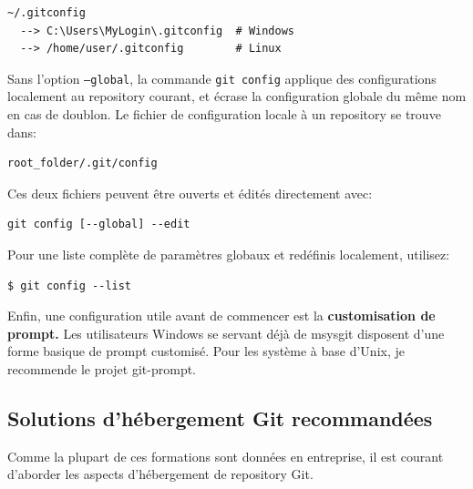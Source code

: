\documentclass{../../common/tufte-latex/tufte-handout}
\begin{document}
\begin{lstlisting}[style=BashInputStyle]
  ~/.gitconfig
  --> C:\Users\MyLogin\.gitconfig  # Windows
  --> /home/user/.gitconfig        # Linux
\end{lstlisting}

Sans l'option \texttt{--global}, la commande \texttt{git config} applique des configurations localement au repository courant, et écrase la configuration globale du même nom en cas de doublon. Le fichier de configuration locale à un repository se trouve dans:

\begin{lstlisting}[style=BashInputStyle]
  root_folder/.git/config
\end{lstlisting}

\noindent Ces deux fichiers peuvent être ouverts et édités directement avec: 

\begin{lstlisting}[style=BashInputStyle]
  git config [--global] --edit
\end{lstlisting}

\noindent Pour une liste complète de paramètres globaux et redéfinis localement, utilisez:

\begin{lstlisting}[style=BashInputStyle]
  $ git config --list
\end{lstlisting}

Enfin, une configuration utile avant de commencer est la \textbf{customisation de prompt.}
Les utilisateurs Windows se servant déjà de msysgit disposent d'une forme basique de prompt customisé. 
Pour les système à base d'Unix, je recommende le projet git-prompt.


\subsection{Solutions d'hébergement Git recommandées}

Comme la plupart de ces formations sont données en entreprise, il est courant d'aborder les aspects d'hébergement de repository Git.
\end{document}
